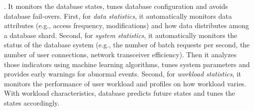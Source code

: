 
. It monitors the database states, tunes database configuration and avoids database fail-overs. First, for \textit{data statistics}, it automatically monitors data attributes (e.g., access frequency, modifications) and how data distributes among a database shard.
Second, for \textit{system statistics}, it automatically monitors the status of the database system (e.g., the number of batch requests per second, the number of user connections, network transceiver efficiency). Then it analyzes those indicators using machine learning algorithms, tunes system parameters and provides early warnings for abnormal events. Second, for \textit{workload statistics}, it monitors the performance of user workload and profiles on how workload varies. With workload characteristics, database predicts future states and tunes the states accordingly.


